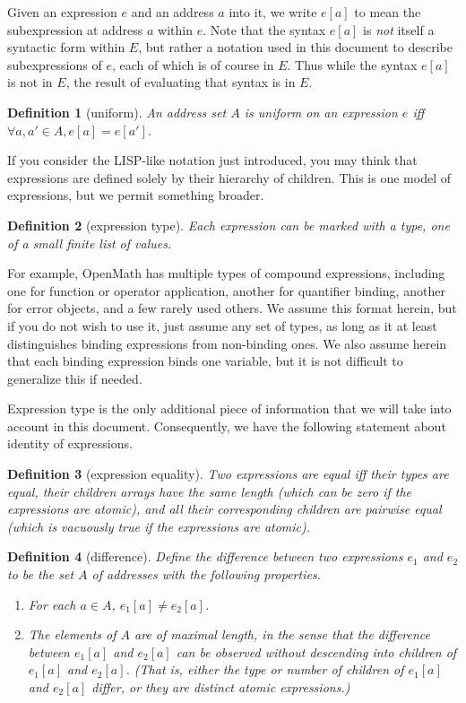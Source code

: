 \documentclass{article}
\newtheorem{dfn}{Definition}
\begin{document}
Given an expression $e$ and an address $a$ into it, we write $e[a]$ to mean the subexpression at address $a$ within $e$.  Note that the syntax $e[a]$ is \emph{not} itself a syntactic form within $E$, but rather a notation used in this document to describe subexpressions of $e$, each of which is of course in $E$.  Thus while the syntax $e[a]$ is not in $E$, the result of evaluating that syntax is in $E$.

\begin{dfn}[uniform]
An address set $A$ is \emph{uniform on} an expression $e$ iff $\forall a,a' \in A, e[a]=e[a']$.
\end{dfn}

If you consider the LISP-like notation just introduced, you may think that expressions are defined solely by their hierarchy of children.  This is one model of expressions, but we permit something broader.

\begin{dfn}[expression type]\label{D:type}
Each expression can be marked with a \emph{type,} one of a small finite list of values.
\end{dfn}

For example, OpenMath has multiple types of compound expressions, including one for function or operator application, another for quantifier binding, another for error objects, and a few rarely used others.  We assume this format herein, but if you do not wish to use it, just assume any set of types, as long as it at least distinguishes binding expressions from non-binding ones.  We also assume herein that each binding expression binds one variable, but it is not difficult to generalize this if needed.

Expression type is the only additional piece of information that we will take into account in this document.  Consequently, we have the following statement about identity of expressions.

\begin{dfn}[expression equality]\label{D:eq}
Two expressions are \emph{equal} iff their types are equal, their children arrays have the same length (which can be zero if the expressions are atomic), and all their corresponding children are pairwise equal (which is vacuously true if the expressions are atomic).
\end{dfn}

\begin{dfn}[difference]\label{D:difference}
Define the \emph{difference} between two expressions $e_1$ and $e_2$ to be the set $A$ of addresses with the following properties.
\begin{enumerate}
\item	For each $a\in A$, $e_1[a]\neq e_2[a]$.
\item	The elements of $A$ are of maximal length, in the sense that the difference between $e_1[a]$ and $e_2[a]$ can be observed without descending into children of $e_1[a]$ and $e_2[a]$.  (That is, either the type or number of children of $e_1[a]$ and $e_2[a]$ differ, or they are distinct atomic expressions.)
\end{enumerate}
\end{dfn}
\end{document}
